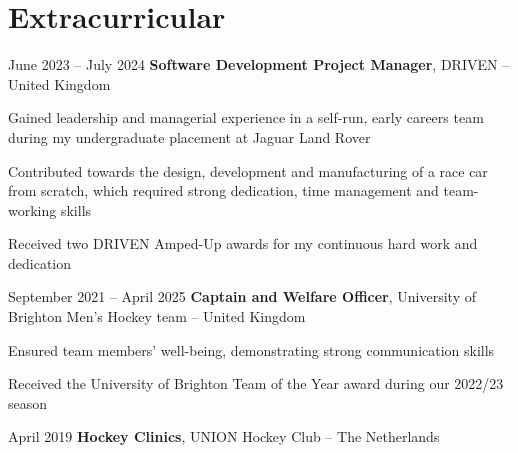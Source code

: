 	
	
	
	\section{Extracurricular}
	
	\begin{twocolentry}{
			June 2023 – July 2024
		}
		\textbf{Software Development Project Manager}, DRIVEN -- United Kingdom\end{twocolentry}
	
	\vspace{0.10 cm}
	\begin{onecolentry}
		\begin{highlights}
			\item Gained leadership and managerial experience in a self-run, early careers team during my undergraduate placement at Jaguar Land Rover
			\item Contributed towards the design, development and manufacturing of a race car from scratch, which required strong dedication, time management and team-working skills
			\item Received two DRIVEN Amped-Up awards for my continuous hard work and dedication
		\end{highlights}
	\end{onecolentry}
	
	\vspace{0.2 cm}
	
	\begin{twocolentry}{
			September 2021 – April 2025
		}
		\textbf{Captain and Welfare Officer}, University of Brighton Men’s Hockey team -- United Kingdom\end{twocolentry}
	
	\vspace{0.10 cm}
	\begin{onecolentry}
		\begin{highlights}
			\item Ensured team members’ well-being, demonstrating strong communication skills
			\item Received the University of Brighton Team of the Year award during our 2022/23 season
		\end{highlights}
	\end{onecolentry}
	
	\vspace{0.2 cm}
	
	\begin{twocolentry}{
			April 2019
		}
		\textbf{Hockey Clinics}, UNION Hockey Club -- The Netherlands\end{twocolentry}
	
